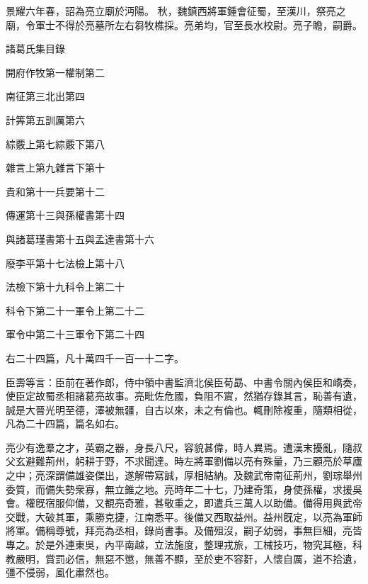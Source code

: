 \begin{pinyinscope}
 
景耀六年春，詔為亮立廟於沔陽。
 秋，魏鎮西將軍鍾會征蜀，至漢川，祭亮之廟，令軍士不得於亮墓所左右芻牧樵採。亮弟均，官至長水校尉。亮子瞻，嗣爵。
 
 
 
 
 諸葛氏集目錄
 
 開府作牧第一權制第二
 
 南征第三北出第四
 
 計筭第五訓厲第六
 
 綜覈上第七綜覈下第八
 
 雜言上第九雜言下第十
 
 貴和第十一兵要第十二
 
 傳運第十三與孫權書第十四
 
 與諸葛瑾書第十五與孟達書第十六
 
 廢李平第十七法檢上第十八
 
 法檢下第十九科令上第二十
 
 科令下第二十一軍令上第二十二
 
 軍令中第二十三軍令下第二十四
 
 右二十四篇，凡十萬四千一百一十二字。
 
 
 
 
 臣壽等言：臣前在著作郎，侍中領中書監濟北侯臣荀勗、中書令關內侯臣和嶠奏，使臣定故蜀丞相諸葛亮故事。亮毗佐危國，負阻不賔，然猶存錄其言，恥善有遺，誠是大晉光明至德，澤被無疆，自古以來，未之有倫也。輒刪除複重，隨類相從，凡為二十四篇，篇名如右。
 
 
 
 
 亮少有逸羣之才，英霸之器，身長八尺，容貌甚偉，時人異焉。遭漢末擾亂，隨叔父玄避難荊州，躬耕于野，不求聞達。時左將軍劉備以亮有殊量，乃三顧亮於草廬之中；亮深謂備雄姿傑出，遂解帶寫誠，厚相結納。及魏武帝南征荊州，劉琮舉州委質，而備失勢衆寡，無立錐之地。亮時年二十七，乃建奇策，身使孫權，求援吳會。權旣宿服仰備，又覩亮奇雅，甚敬重之，即遣兵三萬人以助備。備得用與武帝交戰，大破其軍，乘勝克捷，江南悉平。後備又西取益州。益州旣定，以亮為軍師將軍。備稱尊號，拜亮為丞相，錄尚書事。及備殂沒，嗣子幼弱，事無巨細，亮皆專之。於是外連東吳，內平南越，立法施度，整理戎旅，工械技巧，物究其極，科教嚴明，賞罰必信，無惡不懲，無善不顯，至於吏不容姧，人懷自厲，道不拾遺，彊不侵弱，風化肅然也。
 

\end{pinyinscope}
